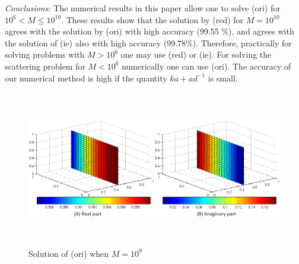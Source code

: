\documentclass[12pt]{elsarticle}
\numberwithin{equation}{section}
\begin{document}
{\em Conclusions:} The numerical results in this paper allow one to solve (ori) for $10^6<M\le 10^{10}$. These results show that the solution by (red) for $M=10^{10}$ agrees with the solution by (ori) with high accuracy (99.55 \%), and agrees with the solution of (ie) also with high accuracy (99.78\%). Therefore, practically for solving problems with $M>10^6$ one may use (red) or (ie). For solving the scattering problem for $M<10^6$ numerically one can use (ori). The accuracy of our
numerical method is high if the quantity $ka+ad^{-1}$ is small.

\pagebreak

\begin{figure}[H]
	\centering
	\includegraphics[width=1.05\linewidth,height=6.8cm]{1b_ori}
	\caption{Solution of (ori) when $M=10^9$}
	\label{fig3}
\end{figure}
\end{document}
